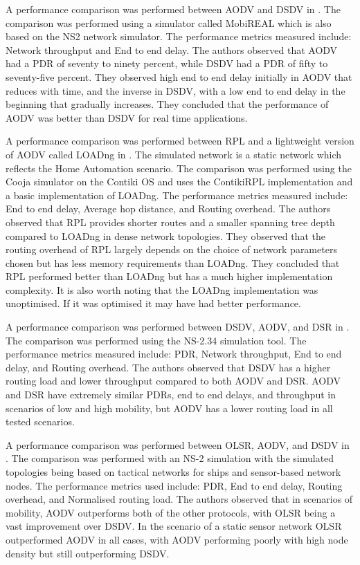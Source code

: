     A performance comparison was performed between AODV and DSDV in \cite{AODV_vs_DSDV}.
    The comparison was performed using a simulator called MobiREAL which is also based
    on the NS2 network simulator. The performance metrics measured include:
    Network throughput and End to end delay. The authors observed that
    AODV had a PDR of seventy to ninety percent, while DSDV had a PDR of fifty to seventy-five percent. They observed
    high end to end delay initially in AODV that reduces with time, and the inverse in
    DSDV, with a low end to end delay in the beginning that gradually increases. They
    concluded that the performance of AODV was better than DSDV for real time applications.

    A performance comparison was performed between RPL and a lightweight version of
    AODV called LOADng in \cite{RPL_vs_AODV}. The simulated network is a static
    network which reflects the Home Automation \cite{roll_home} scenario. The comparison was performed using
    the Cooja simulator on the Contiki OS and uses the ContikiRPL implementation
    and a basic implementation of LOADng. The performance metrics measured include:
    End to end delay, Average hop distance, and Routing overhead. The authors
    observed that RPL provides shorter routes and a smaller spanning tree depth
    compared to LOADng in dense network topologies. They observed that the routing
    overhead of RPL largely depends on the choice of network parameters chosen but
    has less memory requirements than LOADng. They concluded that RPL performed
    better than LOADng but has a much higher implementation complexity. It is also
    worth noting that the LOADng implementation was unoptimised. If it was optimised
    it may have had better performance.

    A performance comparison was performed between DSDV, AODV, and DSR in
    \cite{DSDV_vs_AODV_vs_DSR}. The comparison was performed using the NS-2.34
    simulation tool. The performance metrics measured include: PDR, Network throughput,
    End to end delay, and Routing overhead. The authors observed that DSDV has a
    higher routing load and lower throughput compared to both AODV and DSR. AODV
    and DSR have extremely similar PDRs, end to end delays, and throughput in scenarios
    of low and high mobility, but AODV has a lower routing load in all tested scenarios.

    A performance comparison was performed between OLSR, AODV, and DSDV in
    \cite{OLSR_vs_AODV_vs_DSDV}. The comparison was performed with an NS-2 simulation
    with the simulated topologies being based on tactical networks for ships and
    sensor-based network nodes. The performance metrics used include: PDR, End to
    end delay, Routing overhead, and Normalised routing load. The authors observed
    that in scenarios of mobility, AODV outperforms both of the other protocols,
    with OLSR being a vast improvement over DSDV. In the scenario of a static
    sensor network OLSR outperformed AODV in all cases, with AODV performing
    poorly with high node density but still outperforming DSDV.

